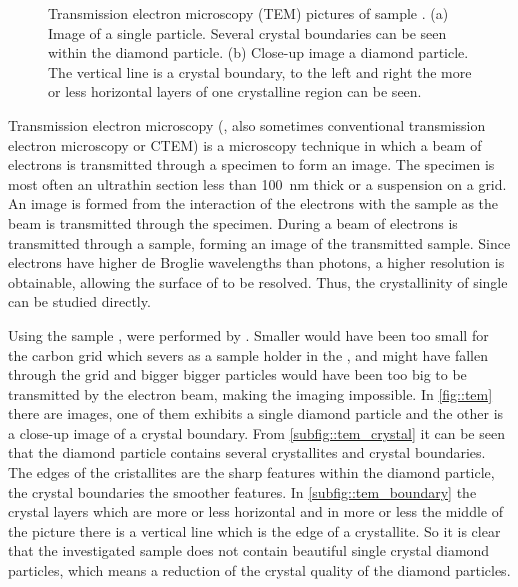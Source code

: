 \begin{figure}[tp]
\begin{subfigure}[t]{ 0.49\linewidth}
				\label{subfig::tem_boundary}
			\end{subfigure}
			\caption[\TEM imaging of a single \nd]{Transmission electron microscopy (TEM) pictures of sample \insituH. (a) Image of a single \nd particle. Several crystal boundaries can be seen within the diamond particle. (b) Close-up image a diamond particle. The vertical line is a crystal boundary, to the left and right the more or less horizontal layers of one crystalline region can be seen.}
			\label{fig::tem}
		\end{figure}

		Transmission electron microscopy (\TEM, also sometimes conventional transmission electron microscopy or CTEM) is a microscopy technique in which a beam of electrons is transmitted through a specimen to form an image. The specimen is most often an ultrathin section less than \SI{100}{\nm} thick or a suspension on a grid. An image is formed from the interaction of the electrons with the sample as the beam is transmitted through the specimen.
		During \tem a beam of electrons is transmitted through a sample, forming an image of the transmitted sample.
		Since electrons have higher de Broglie wavelengths than photons, a higher resolution is obtainable, allowing the surface of \nds to be resolved. Thus, the crystallinity of single \nds can be studied directly.

		Using the sample \insituH, \TEM were performed by \schmauch.
		Smaller \nds would have been too small for the carbon grid which severs as a sample holder in the \TEM, and might have fallen through the grid and bigger bigger particles would have been too big to be transmitted by the electron beam, making the imaging impossible.
		In \autoref{fig::tem} there are \TEM images, one of them exhibits a single diamond particle and the other is a close-up image of a crystal boundary.
		From \autoref{subfig::tem_crystal} it can be seen that the diamond particle contains several crystallites and crystal boundaries.
		The edges of the cristallites are the sharp features within the diamond particle, the crystal boundaries the smoother features.
		In \autoref{subfig::tem_boundary} the crystal layers which are more or less horizontal and in more or less the middle of the picture there is a vertical line which is the edge of a crystallite.
		So it is clear that the investigated sample does not contain beautiful single crystal diamond particles, which means a reduction of the crystal quality of the diamond particles.
